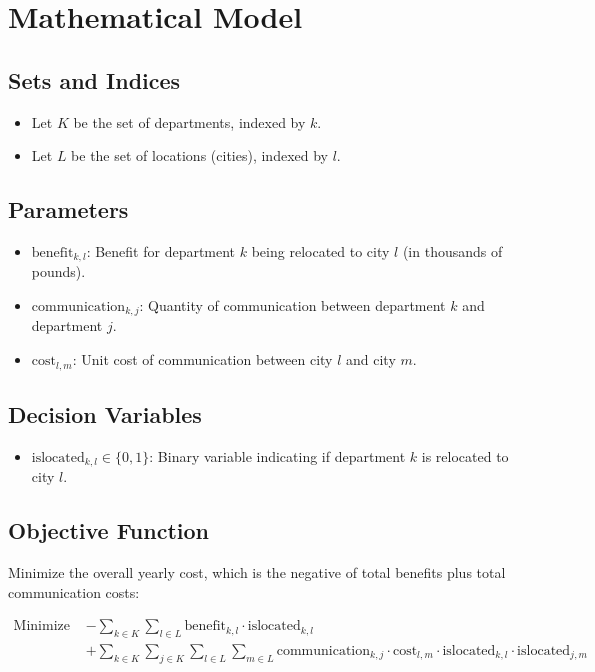 \documentclass{article}
\begin{document}
\section*{Mathematical Model}

\subsection*{Sets and Indices}
\begin{itemize}
    \item Let \( K \) be the set of departments, indexed by \( k \).
    \item Let \( L \) be the set of locations (cities), indexed by \( l \).
\end{itemize}

\subsection*{Parameters}
\begin{itemize}
    \item \( \text{benefit}_{k, l} \): Benefit for department \( k \) being relocated to city \( l \) (in thousands of pounds).
    \item \( \text{communication}_{k, j} \): Quantity of communication between department \( k \) and department \( j \).
    \item \( \text{cost}_{l, m} \): Unit cost of communication between city \( l \) and city \( m \).
\end{itemize}

\subsection*{Decision Variables}
\begin{itemize}
    \item \( \text{islocated}_{k, l} \in \{0, 1\} \): Binary variable indicating if department \( k \) is relocated to city \( l \).
\end{itemize}

\subsection*{Objective Function}
Minimize the overall yearly cost, which is the negative of total benefits plus total communication costs:

\[
\begin{align*}
\text{Minimize } & -\sum_{k \in K} \sum_{l \in L} \text{benefit}_{k, l} \cdot \text{islocated}_{k, l} \\
& + \sum_{k \in K} \sum_{j \in K} \sum_{l \in L} \sum_{m \in L} \text{communication}_{k, j} \cdot \text{cost}_{l, m} \cdot \text{islocated}_{k, l} \cdot \text{islocated}_{j, m}
\end{align*}
\]
\end{document}
